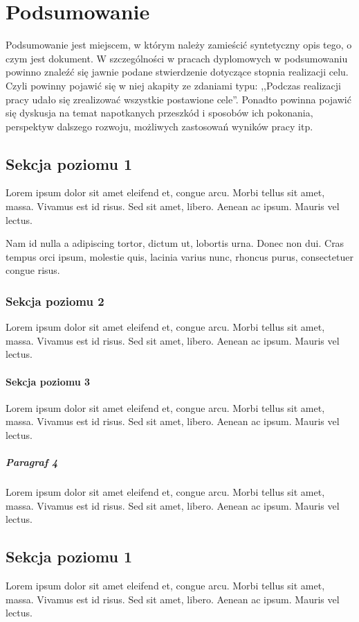 \chapter{Podsumowanie}
\label{chap:podsumowanie}
Podsumowanie jest miejscem, w którym należy zamieścić syntetyczny opis tego, o czym jest dokument. W szczególności w pracach dyplomowych w podsumowaniu powinno znaleźć się jawnie podane stwierdzenie dotyczące stopnia realizacji celu. Czyli powinny pojawić się w niej akapity ze zdaniami typu: ,,Podczas realizacji pracy udało się zrealizować wszystkie postawione cele''. Ponadto powinna pojawić się dyskusja na temat napotkanych przeszkód i sposobów ich pokonania, perspektyw dalszego rozwoju, możliwych zastosowań wyników pracy itp. 

\section{Sekcja poziomu 1}%
Lorem ipsum dolor sit amet eleifend et, congue arcu. Morbi tellus sit amet, massa. Vivamus est id risus. Sed sit amet, libero. Aenean ac ipsum. Mauris vel lectus. 

Nam id nulla a adipiscing tortor, dictum ut, lobortis urna. Donec non dui. Cras tempus orci ipsum, molestie quis, lacinia varius nunc, rhoncus purus, consectetuer congue risus. 

\subsection{Sekcja poziomu 2}
Lorem ipsum dolor sit amet eleifend et, congue arcu. Morbi tellus sit amet, massa. Vivamus est id risus. Sed sit amet, libero. Aenean ac ipsum. Mauris vel lectus. 
\subsubsection{Sekcja poziomu 3}
Lorem ipsum dolor sit amet eleifend et, congue arcu. Morbi tellus sit amet, massa. Vivamus est id risus. Sed sit amet, libero. Aenean ac ipsum. Mauris vel lectus. 
\paragraph{Paragraf 4}
Lorem ipsum dolor sit amet eleifend et, congue arcu. Morbi tellus sit amet, massa. Vivamus est id risus. Sed sit amet, libero. Aenean ac ipsum. Mauris vel lectus. 
\section{Sekcja poziomu 1}%
Lorem ipsum dolor sit amet eleifend et, congue arcu. Morbi tellus sit amet, massa. Vivamus est id risus. Sed sit amet, libero. Aenean ac ipsum. Mauris vel lectus. 

